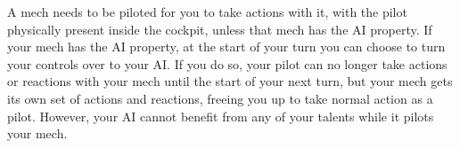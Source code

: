 A mech needs to be piloted for you to take actions with it, with the pilot physically present inside the cockpit, unless that mech has the AI property. If your mech has the AI property, at the start of your turn you can choose to turn your controls over to your AI. If you do so, your pilot can no longer take actions or reactions with your mech until the start of your next turn, but your mech gets its own set of actions and reactions, freeing you up to take normal action as a pilot. However, your AI cannot benefit from any of your talents while it pilots your mech.
